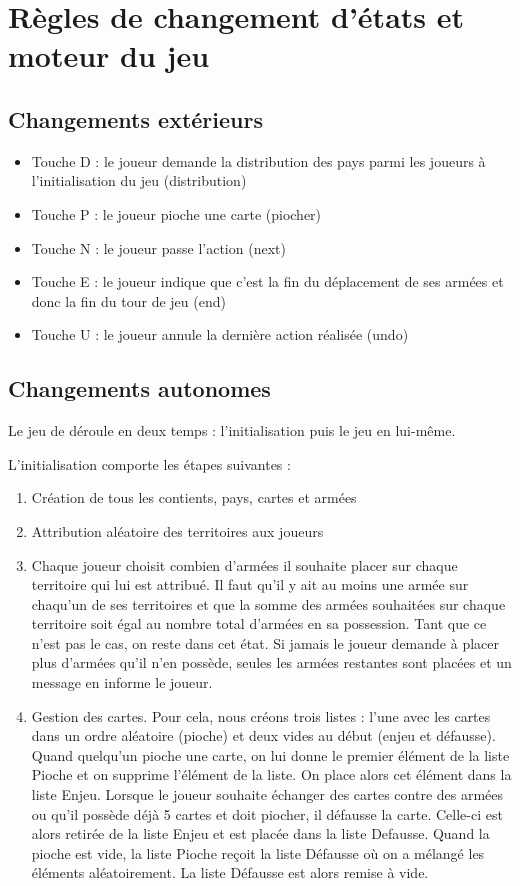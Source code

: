 \section{Règles de changement d'états et moteur du jeu}

\subsection{Changements extérieurs}
\begin{itemize}
    \item Touche D : le joueur demande la distribution des pays parmi les joueurs à l'initialisation du jeu (distribution)
    \item Touche P : le joueur pioche une carte (piocher)
    \item Touche N : le joueur passe l'action (next)
    \item Touche E : le joueur indique que c'est la fin du déplacement de ses armées et donc la fin du tour de jeu (end)
    \item Touche U : le joueur annule la dernière action réalisée (undo)
\end{itemize}

\subsection{Changements autonomes}

Le jeu de déroule en deux temps : l'initialisation puis le jeu en lui-même. 

\vspace{0.3cm}
L'initialisation comporte les étapes suivantes : 
\begin{enumerate}
    \item Création de tous les contients, pays, cartes et armées
    \item Attribution aléatoire des territoires aux joueurs 
    \item Chaque joueur choisit combien d'armées il souhaite placer sur chaque territoire qui lui est attribué. Il faut qu'il y ait au moins une armée sur chaqu'un de ses territoires et que la somme des armées souhaitées sur chaque territoire soit égal au nombre total d'armées en sa possession. Tant que ce n'est pas le cas, on reste dans cet état. Si jamais le joueur demande à placer plus d'armées qu'il n'en possède, seules les armées restantes sont placées et un message en informe le joueur.
    \item Gestion des cartes. Pour cela, nous créons trois listes :  l’une avec les cartes dans un ordre aléatoire (pioche) et deux vides au début (enjeu et défausse). Quand quelqu’un pioche une carte, on lui donne le premier élément de la liste Pioche et on supprime l’élément de la liste. On place alors cet élément dans la liste Enjeu. Lorsque le joueur souhaite échanger des cartes contre des armées ou qu'il possède déjà 5 cartes et doit piocher, il défausse la carte. Celle-ci est alors retirée de la liste Enjeu et est placée dans la liste Defausse. Quand la pioche est vide, la liste Pioche reçoit la liste Défausse où on a mélangé les éléments aléatoirement. La liste Défausse est alors remise à vide.
\end{enumerate}

